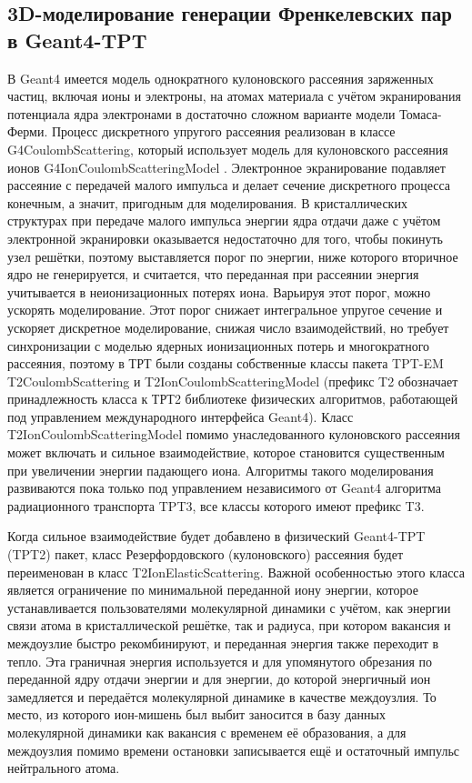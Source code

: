 \documentclass[a4paper,12pt]{article}
\begin{document}
\begin{large}
\subsection{3D-моделирование генерации Френкелевских пар в Geant4-TPT}
\label{subMod1}
 
 В Geant4 имеется модель однократного кулоновского рассеяния заряженных частиц, включая ионы и электроны, на атомах материала с учётом экранирования потенциала ядра электронами в достаточно сложном варианте модели Томаса-Ферми.
 Процесс дискретного упругого рассеяния реализован в классе G4CoulombScattering, который использует модель для кулоновского рассеяния ионов G4IonCoulombScatteringModel \cite{IonEl}.
 Электронное экранирование подавляет рассеяние с передачей малого импульса и делает сечение дискретного процесса конечным, а значит, пригодным для моделирования.
 В кристаллических структурах при передаче малого импульса энергии ядра отдачи даже с учётом электронной экранировки оказывается недостаточно для того, чтобы покинуть узел решётки, поэтому выставляется порог по энергии, ниже которого вторичное ядро не генерируется, и считается, что переданная при рассеянии энергия учитывается в неионизационных потерях иона.
 Варьируя этот порог, можно ускорять моделирование.
 Этот порог снижает интегральное упругое сечение и ускоряет дискретное моделирование, снижая число взаимодействий, но требует синхронизации с моделью ядерных ионизационных потерь и многократного рассеяния, поэтому в ТРТ были созданы собственные классы пакета TPT-EM T2CoulombScattering и T2IonCoulombScatteringModel (префикс T2 обозначает принадлежность класса к ТРТ2 библиотеке физических алгоритмов, работающей под управлением международного интерфейса Geant4).
 Класс T2IonCoulombScatteringModel помимо унаследованного кулоновского рассеяния может включать и сильное взаимодействие, которое становится существенным при увеличении энергии падающего иона.
Алгоритмы такого моделирования развиваются пока только под управлением независимого от Geant4 алгоритма радиационного транспорта TPT3, все классы которого имеют префикс T3.

 Когда сильное взаимодействие будет добавлено в физический Geant4-TPT (TPT2) пакет, класс Резерфордовского (кулоновского) рассеяния будет переименован в класс T2IonElasticScattering.
 Важной особенностью этого класса является ограничение по минимальной переданной иону энергии, которое устанавливается пользователями молекулярной динамики с учётом, как энергии связи атома в кристаллической решётке, так и радиуса, при котором вакансия и междоузлие быстро рекомбинируют, и переданная энергия также переходит в тепло.
 Эта граничная энергия используется и для упомянутого обрезания по переданной ядру отдачи энергии и для энергии, до которой энергичный ион замедляется и передаётся молекулярной динамике в качестве междоузлия.
 То место, из которого ион-мишень был выбит заносится в базу данных молекулярной динамики как вакансия с временем её образования, а для междоузлия помимо времени остановки записывается ещё и остаточный импульс нейтрального атома.


\end{large}
\end{document}

